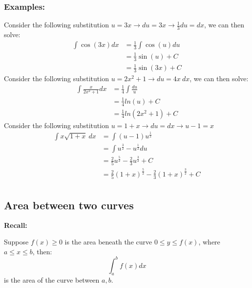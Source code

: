 \documentclass[a4paper]{article}
\begin{document}
  \subsubsection{Examples:}
  Consider the following substitution $u = 3x \rightarrow du = 3x \rightarrow \frac{1}{3} du = dx$, we can then solve:
  \begin{equation}
    \label{Example 1}
    \begin{split}
      \int \cos (3x) dx   
                        &= \frac{1}{3} \int \cos (u) du \\
                        &= \frac{1}{3} \sin (u) + C \\
                        &= \frac{1}{3} \sin (3x) + C
    \end{split}
  \end{equation}
  Consider the following substitution $u = 2x^2 +1 \rightarrow du = 4x\ dx $, we can then solve:
  \begin{equation}
    \label{Example 2}
    \begin{split}
      \int \frac{x }{2x^2+1} dx &= \frac{1}{4} \int \frac{du }{u}\\
                                &= \frac{1}{4} ln(u) + C\\
                                &= \frac{1}{4} ln (2x^2+1) + C
    \end{split}
  \end{equation}
  Consider the following substitution $ u = 1+x \rightarrow du = dx \rightarrow u - 1 = x$
  \begin{equation}
    \label{Example 3}
    \begin{split}
      \int x \sqrt{1+x}\ dx &= \int (u-1) u ^{\frac{1 }{2}} \\
                            &= \int u^{\frac{3 }{2}} - u^{\frac{1 }{2 }}du \\
                            &= \frac{2 }{5} u^{\frac{5 }{2 }} - \frac{2 }{3} u^{\frac{3 }{2}} + C\\
                            &= \frac{2 }{5} (1+x)^{\frac{5 }{2 }} - \frac{2 }{3} (1+x)^{\frac{3 }{2}} + C\\
    \end{split}
  \end{equation}
  \subsection{Area between two curves}
  \textbf{Recall:}

  Suppose $f(x) \geq 0$ is the area beneath the curve $0\le y \le f(x)$, where $a\le x \le b$, then:
  $$
    \displaystyle\int_{a}^{b} f(x) dx  
  $$
  is the area of the curve between $a,b$.
\end{document}

